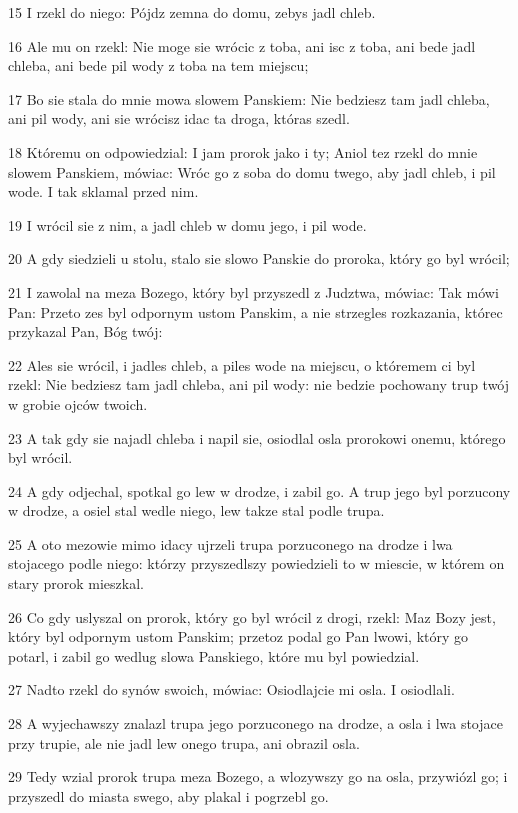 \par 15 I rzekl do niego: Pójdz zemna do domu, zebys jadl chleb.
\par 16 Ale mu on rzekl: Nie moge sie wrócic z toba, ani isc z toba, ani bede jadl chleba, ani bede pil wody z toba na tem miejscu;
\par 17 Bo sie stala do mnie mowa slowem Panskiem: Nie bedziesz tam jadl chleba, ani pil wody, ani sie wrócisz idac ta droga, któras szedl.
\par 18 Któremu on odpowiedzial: I jam prorok jako i ty; Aniol tez rzekl do mnie slowem Panskiem, mówiac: Wróc go z soba do domu twego, aby jadl chleb, i pil wode. I tak sklamal przed nim.
\par 19 I wrócil sie z nim, a jadl chleb w domu jego, i pil wode.
\par 20 A gdy siedzieli u stolu, stalo sie slowo Panskie do proroka, który go byl wrócil;
\par 21 I zawolal na meza Bozego, który byl przyszedl z Judztwa, mówiac: Tak mówi Pan: Przeto zes byl odpornym ustom Panskim, a nie strzegles rozkazania, którec przykazal Pan, Bóg twój:
\par 22 Ales sie wrócil, i jadles chleb, a piles wode na miejscu, o któremem ci byl rzekl: Nie bedziesz tam jadl chleba, ani pil wody: nie bedzie pochowany trup twój w grobie ojców twoich.
\par 23 A tak gdy sie najadl chleba i napil sie, osiodlal osla prorokowi onemu, którego byl wrócil.
\par 24 A gdy odjechal, spotkal go lew w drodze, i zabil go. A trup jego byl porzucony w drodze, a osiel stal wedle niego, lew takze stal podle trupa.
\par 25 A oto mezowie mimo idacy ujrzeli trupa porzuconego na drodze i lwa stojacego podle niego: którzy przyszedlszy powiedzieli to w miescie, w którem on stary prorok mieszkal.
\par 26 Co gdy uslyszal on prorok, który go byl wrócil z drogi, rzekl: Maz Bozy jest, który byl odpornym ustom Panskim; przetoz podal go Pan lwowi, który go potarl, i zabil go wedlug slowa Panskiego, które mu byl powiedzial.
\par 27 Nadto rzekl do synów swoich, mówiac: Osiodlajcie mi osla. I osiodlali.
\par 28 A wyjechawszy znalazl trupa jego porzuconego na drodze, a osla i lwa stojace przy trupie, ale nie jadl lew onego trupa, ani obrazil osla.
\par 29 Tedy wzial prorok trupa meza Bozego, a wlozywszy go na osla, przywiózl go; i przyszedl do miasta swego, aby plakal i pogrzebl go.
